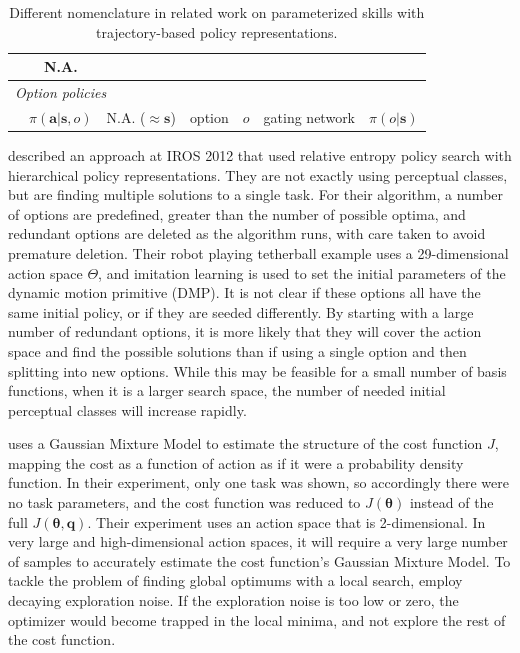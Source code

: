\documentclass[12pt]{article}
\newcommand{\mymath}[1]{\ensuremath{#1}\xspace}
\newcommand{\app}    {\mymath{\bm{\theta}}}
\newcommand{\appsp}  {\mymath{\Theta}}
\newcommand{\taskp}  {\mymath{\mathbf{q}}}
\newcommand{\costf}  {\mymath{J}}
\begin{document}
\begin{table}[ht]
\begin{scriptsize}
\begin{tabular}{|l|l|rl|rl|rl|}
& \multicolumn{2}{c|}{N.A.} \\  
\hline
\multicolumn{8}{|l|}{\em Option policies}\\
\citet{daniel12learning}    
& $\pi(\mathbf{a}|\mathbf{s},o)$
& \multicolumn{2}{c|}{N.A. ($\approx\mathbf{s}$)}   
& option           & $o$ 
& gating network   & $\pi(o|\mathbf{s})$ \\  
\end{tabular}
\end{scriptsize}
  \caption{\label{tab_nomenclature} Different nomenclature in related work on parameterized skills with trajectory-based policy representations.}
\end{table}




\citet{daniel12learning} described an approach at IROS 2012  that used relative entropy policy search with hierarchical policy representations. They are not exactly using perceptual classes, but are finding multiple solutions to a single task. For their algorithm, a number of options are predefined, greater than the number of possible optima, and redundant options are deleted as the algorithm runs, with care taken to avoid premature deletion. Their robot playing tetherball example uses a 29-dimensional action space $\appsp$, and imitation learning is used to set the initial parameters of the dynamic motion primitive (DMP). It is not clear if these options all have the same initial policy, or if they are seeded differently. By starting with a large number of redundant options, it is more likely that they will cover the action space and find the possible solutions than if using a single option and then splitting into new options. While this may be feasible for a small number of basis functions, when it is a larger search space, the number of needed initial perceptual classes will increase rapidly. 

\citet{calinon13compliant} uses a Gaussian Mixture Model to estimate the structure of the cost function \costf, mapping the cost as a function of action as if it were a probability density function. In their experiment, only one task was shown, so accordingly there were no task parameters, and the cost function was reduced to $\costf(\app)$ instead of the full $\costf(\app,\taskp)$. Their experiment uses an action space that is 2-dimensional. In very large and high-dimensional action spaces, it will require a very large number of samples to accurately estimate the cost function's Gaussian Mixture Model. To tackle the problem of finding global optimums with a local search, \citet{calinon13compliant} employ decaying exploration noise. If the exploration noise is too low or zero, the optimizer would become trapped in the local minima, and not explore the rest of the cost function.
\end{document}
